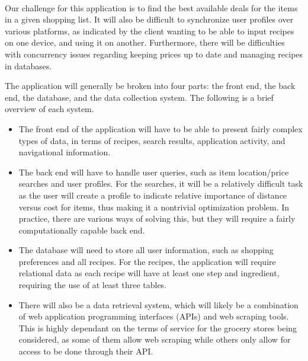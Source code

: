 
\\Our challenge for this application is to find the best available deals for the items in a given shopping list.  It will also be difficult to synchronize user profiles over various platforms, as indicated by the client wanting to be able to input recipes on one device, and using it on another.  Furthermore, there will be difficulties with concurrency issues regarding keeping prices up to date and managing recipes in databases.

The application will generally be broken into four parts: the front end, the back end, the database, and the data collection system.  The following is a brief overview of each system.
\begin{itemize}
    \item The front end of the application will have to be able to present fairly complex types of data, in terms of recipes, search results, application activity, and navigational information.
    \item The back end will have to handle user queries, such as item location/price searches and user profiles.  For the searches, it will be a relatively difficult task as the user will create a profile to indicate relative importance of distance versus cost for items, thus making it a nontrivial optimization problem.  In practice, there are various ways of solving this, but they will require a fairly computationally capable back end.
    \item The database will need to store all user information, such as shopping preferences and all recipes.  For the recipes, the application will require relational data as each recipe will have at least one step and ingredient, requiring the use of at least three tables.
    \item There will also be a data retrieval system, which will likely be a combination of web application programming interfaces (APIs) and web scraping tools.  This is highly dependant on the terms of service for the grocery stores being considered, as some of them allow web scraping while others only allow for access to be done through their API.
\end{itemize}
